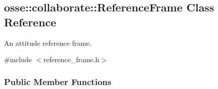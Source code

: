 \hypertarget{classosse_1_1collaborate_1_1_reference_frame}{}\subsection{osse\+:\+:collaborate\+:\+:Reference\+Frame Class Reference}
\label{classosse_1_1collaborate_1_1_reference_frame}


An attitude reference frame.  




{\ttfamily \#include $<$reference\+\_\+frame.\+h$>$}

\subsubsection*{Public Member Functions}
